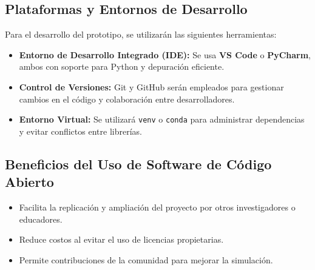 \subsection{Plataformas y Entornos de Desarrollo}

Para el desarrollo del prototipo, se utilizarán las siguientes herramientas:

\begin{itemize}
    \item \textbf{Entorno de Desarrollo Integrado (IDE):} Se usa \textbf{VS Code} o \textbf{PyCharm}, ambos con soporte para Python y depuración eficiente.
    \item \textbf{Control de Versiones:} Git y GitHub serán empleados para gestionar cambios en el código y colaboración entre desarrolladores.
    \item \textbf{Entorno Virtual:} Se utilizará \texttt{venv} o \texttt{conda} para administrar dependencias y evitar conflictos entre librerías.
\end{itemize}

\subsection{Beneficios del Uso de Software de Código Abierto}
\begin{itemize}
    \item Facilita la replicación y ampliación del proyecto por otros investigadores o educadores.
    \item Reduce costos al evitar el uso de licencias propietarias.
    \item Permite contribuciones de la comunidad para mejorar la simulación.
\end{itemize}

